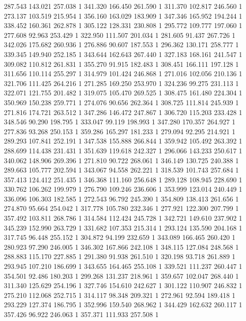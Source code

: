 	287.543	143.021	257.038	1
	341.320	166.450	261.590	1
	311.370	102.817	246.560	1
	273.137	103.519	215.954	1
	356.160	163.029	183.909	1
	347.346	165.952	194.244	1
	338.452	160.361	262.878	1
	305.122	128.331	230.808	1
	295.772	109.777	197.060	1
	277.608	92.963	253.429	1
	322.950	111.507	201.034	1
	281.605	91.437	267.726	1
	342.026	175.682	260.936	1
	276.886	90.607	187.553	1
	296.362	130.171	258.777	1
	339.345	149.940	252.185	1
	343.644	162.643	267.440	1
	327.183	168.161	241.547	1
	309.082	110.812	261.831	1
	355.270	91.915	182.483	1
	308.451	166.111	197.128	1
	311.656	110.114	255.297	1
	314.979	101.424	246.868	1
	271.016	102.056	210.136	1
	321.706	111.425	264.216	1
	271.285	169.250	253.970	1
	324.236	99.275	231.113	1
	322.071	121.755	201.482	1
	319.075	105.470	269.525	1
	308.475	161.480	224.304	1
	350.969	150.238	259.771	1
	274.076	90.656	262.364	1
	308.725	111.814	245.939	1
	271.816	174.721	263.512	1
	347.286	146.472	247.867	1
	306.720	115.203	233.428	1
	348.546	90.290	198.795	1
	333.047	99.119	198.993	1
	347.280	170.357	264.927	1
	277.836	93.268	250.153	1
	359.286	165.297	181.233	1
	279.094	92.295	214.921	1
	289.293	107.841	252.191	1
	347.538	155.888	266.844	1
	359.942	105.492	263.392	1
	288.699	114.438	231.431	1
	351.639	119.618	242.327	1
	296.066	143.233	250.617	1
	340.062	148.906	269.396	1
	271.810	90.722	268.061	1
	346.149	130.725	240.388	1
	289.663	105.777	202.594	1
	343.067	94.558	262.221	1
	318.539	101.743	257.684	1
	357.413	124.412	251.435	1
	346.368	111.160	256.648	1
	289.128	108.945	228.690	1
	330.762	106.262	199.979	1
	276.790	109.246	236.606	1
	353.999	123.014	240.449	1
	336.096	106.303	182.585	1
	272.543	96.792	245.390	1
	354.809	138.413	261.656	1
	274.870	95.664	254.042	1
	317.778	105.780	232.346	1
	277.921	122.300	207.799	1
	357.492	103.811	268.786	1
	314.584	112.424	245.728	1
	342.721	149.610	237.902	1
	345.239	152.990	263.729	1
	331.682	107.353	215.314	1
	293.124	135.590	204.168	1
	317.745	96.448	255.152	1
	304.872	94.199	232.659	1
	343.089	166.465	260.420	1
	280.923	97.290	246.005	1
	346.302	167.866	242.108	1
	348.115	127.084	248.568	1
	288.883	115.170	227.885	1
	291.380	91.938	261.510	1
	320.198	93.718	261.889	1
	293.945	107.210	186.699	1
	343.655	164.465	255.108	1
	339.521	111.237	260.447	1
	354.501	92.486	180.203	1
	299.268	131.237	218.961	1
	359.657	102.047	268.440	1
	311.340	125.629	254.196	1
	327.746	154.610	242.627	1
	301.122	110.907	246.832	1
	275.210	112.068	252.715	1
	314.117	98.348	209.321	1
	272.961	92.594	189.418	1
	293.229	127.374	186.795	1
	352.996	159.540	268.962	1
	344.429	162.632	260.117	1
	357.426	96.922	246.063	1
	357.371	111.933	257.508	1
